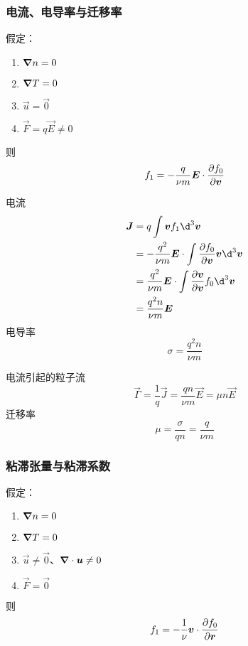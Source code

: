 \subsubsection{电流、电导率与迁移率}

假定：
\begin{enumerate}
    \item $\bm{\nabla}{n} = 0$
    \item $\bm{\nabla}{T} = 0$
    \item $\vec{u} = \vec{0}$
    \item $\vec{F} = q\vec{E} \neq 0$
\end{enumerate}
则
\begin{equation}
f_1 = - \frac{q}{\nu m} \bm{E} \cdot \pdv{f_0}{\bm{v}}
\end{equation}

电流
\begin{equation}\begin{aligned}
\vec{J} &= q \int \vec{v} f_1 \d^3\vec{v} \\
&= - \frac{q^2}{\nu m} \vec{E} \cdot
\int \pdv{f_0}{\vec{v}} \vec{v} \d^3\vec{v} \\
&= \frac{q^2}{\nu m} \vec{E} \cdot
\int \pdv{\vec{v}}{\vec{v}} f_0 \d^3\vec{v} \\
&= \frac{q^2 n}{\nu m} \vec{E}
\end{aligned}\end{equation}
电导率
\begin{equation}
\sigma = \frac{q^2 n}{\nu m}
\end{equation}

电流引起的粒子流
\begin{equation}
\vec{\Gamma} = \frac{1}{q} \vec{J}
= \frac{q n}{\nu m} \vec{E} = \mu n \vec{E}
\end{equation}
迁移率
\begin{equation}
\mu = \frac{\sigma}{q n} = \frac{q}{\nu m}
\end{equation}

\subsubsection{粘滞张量与粘滞系数}

假定：
\begin{enumerate}
    \item $\bm{\nabla}{n} = 0$
    \item $\bm{\nabla}{T} = 0$
    \item $\vec{u} \neq \vec{0}$、$\bm{\nabla} \cdot{\bm{u}} \neq 0$
    \item $\vec{F} = \vec{0}$
\end{enumerate}
则
\begin{equation}
f_1 = - \frac{1}{\nu} \bm{v} \cdot \pdv{f_0}{\bm{r}}
\end{equation}

